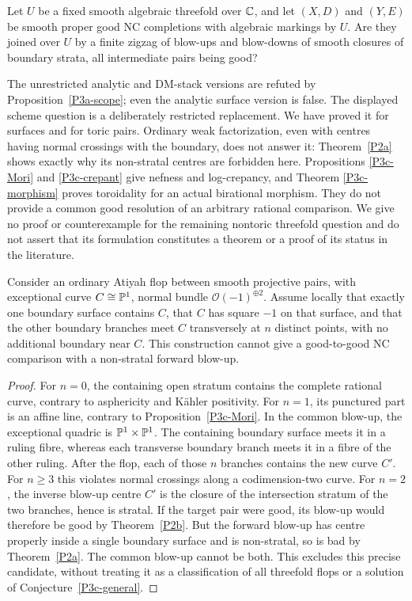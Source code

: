 \begin{conjecture}\label{P3c-general}
Let $U$ be a fixed smooth algebraic threefold over $\mathbb C$, and
let $(X,D)$ and $(Y,E)$ be smooth proper good NC completions
with algebraic markings by $U$. Are they joined over $U$ by
a finite zigzag of blow-ups and blow-downs of smooth closures
of boundary strata, all intermediate pairs being good?
\end{conjecture}

The unrestricted analytic and DM-stack versions are refuted
by Proposition~\ref{P3a-scope}; even the analytic surface
version is false. The displayed scheme question is a
deliberately restricted replacement. We have proved it for
surfaces and for toric pairs. Ordinary weak factorization,
even with centres having normal crossings with the boundary,
does not answer it: Theorem~\ref{P2a} shows exactly why its
non-stratal centres are forbidden here. Propositions
\ref{P3c-Mori} and \ref{P3c-crepant} give nefness and log-crepancy,
and Theorem \ref{P3c-morphism} proves toroidality for an actual
birational morphism. They do not provide a common good resolution
of an arbitrary rational comparison. We give no proof or
counterexample for the remaining nontoric threefold question
and do not assert that its formulation constitutes a theorem
or a proof of its status in the literature.

\begin{proposition}\label{P3c-flop-test}
Consider an ordinary Atiyah flop between smooth projective pairs,
with exceptional curve
$C\cong\mathbb P^1$, normal bundle $\mathcal O(-1)^{\oplus2}$.
Assume locally that exactly one boundary surface contains
$C$, that $C$ has square $-1$ on that surface, and that the
other boundary branches meet $C$ transversely at $n$ distinct
points, with no additional boundary near $C$. This construction
cannot give a good-to-good NC comparison with a non-stratal
forward blow-up.
\end{proposition}
\begin{proof}
For $n=0$, the containing open stratum contains the complete
rational curve, contrary to asphericity and Kähler positivity.
For $n=1$, its punctured part is an affine line, contrary to
Proposition~\ref{P3c-Mori}. In the common blow-up, the exceptional
quadric is $\mathbb P^1\times\mathbb P^1$. The containing boundary surface
meets it in a ruling fibre, whereas each transverse boundary
branch meets it in a fibre of the other ruling. After the
flop, each of those $n$ branches contains the new curve $C'$.
For $n\ge3$ this violates normal crossings along a codimension-two
curve. For $n=2$, the inverse blow-up centre $C'$ is the closure
of the intersection stratum of the two branches, hence is
stratal. If the target pair were good, its blow-up would
therefore be good by Theorem~\ref{P2b}. But the forward
blow-up has centre properly inside a single boundary surface
and is non-stratal, so is bad by Theorem~\ref{P2a}. The common
blow-up cannot be both. This excludes this precise candidate,
without treating it as a classification of all threefold
flops or a solution of Conjecture~\ref{P3c-general}.
\end{proof}
